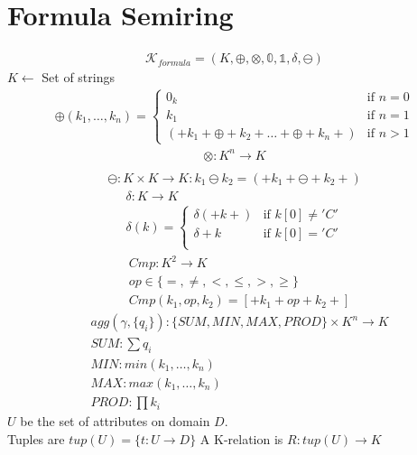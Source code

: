 \documentclass{article}
\begin{document}
\section{Formula Semiring}
\begin{align*}
  \mathcal{K}_{formula} = (K, \oplus, \otimes, \mathbb{0}, \mathbb{1}, \delta, \ominus)
\end{align*}
$K \leftarrow$ Set of strings\\
\begin{align*}
\oplus (k_1,\dots, k_n) = \begin{cases}
    0_k & \text{if } n = 0\\
    k_1 & \text{if } n = 1\\
    (+k_1 + \oplus + k_2 + \dots + \oplus + k_n +) & \text{if } n > 1  
\end{cases}
\end{align*}
\begin{align*}
  \otimes: K^n \rightarrow K \\
\end{align*}
\begin{align*}
  \ominus: K\times K \rightarrow K: k_1 \ominus k_2 = (+k_1+ \ominus +k_2+)
\end{align*} 
\begin{align*}
\delta: K \rightarrow K\\
\delta(k) = \begin{cases}
    \delta(+k+) & \text{if } k[0] \neq 'C'\\
    \delta +k & \text{if } k[0] = 'C'\\
    \end{cases}
\end{align*}
\begin{align*}
  &Cmp: K^2 \rightarrow K\\
  &op\in\{=,\neq, <, \leq, >, \geq\}\\
  &Cmp(k_1, op, k_2) = [+k_1 + op + k_2 +]
\end{align*}
\begin{align*}
&agg(\gamma, \{q_i\}): \{SUM, MIN, MAX, PROD\}\times K^n \rightarrow K\\
&SUM: \sum q_i\\
&MIN: min(k_1, \dots, k_n)\\
&MAX: max(k_1, \dots, k_n)\\
&PROD: \prod k_i
\end{align*}
$U$ be the set of attributes on domain $D$.\\
Tuples are $tup(U) = \{t: U \rightarrow D\}$
A K-relation is $R: tup(U) \rightarrow K$
\end{document}
